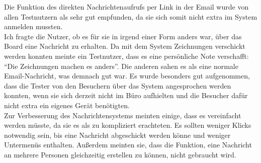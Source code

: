 Die Funktion des direkten Nachrichtenaufrufs per Link in der Email wurde von allen Testnutzern als sehr gut empfunden, da sie sich somit nicht extra im System anmelden mussten.
\\
Ich fragte die Nutzer, ob es für sie in irgend einer Form anders war, über das Board eine Nachricht zu erhalten.
Da mit dem System Zeichnungen verschickt werden konnten meinte ein Testnutzer, dass es eine persönliche Note verschafft: ``Die Zeichnungen machen es anders''.
Die anderen sahen es als eine normale Email-Nachricht, was demnach gut war.
Es wurde besonders gut aufgenommen, dass die Tester von den Besuchern über das System angesprochen werden konnten, wenn sie sich derzeit nicht im Büro aufhielten und die Besucher dafür nicht extra ein eigenes Gerät benötigten.
\\
Zur Verbesserung des Nachrichtensystems meinten einige, dass es vereinfacht werden müsste, da sie es als zu kompliziert erachteten.
Es sollten weniger Klicks notwendig sein, bis eine Nachricht abgeschickt werden könne und weniger Untermenüs enthalten.
Außerdem meinten sie, dass die Funktion, eine Nachricht an mehrere Personen gleichzeitig erstellen zu können, nicht gebraucht wird.






